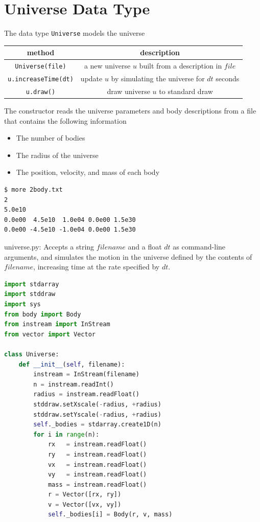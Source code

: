 \documentclass[8pt,a4paper,compress,handout]{beamer}
\begin{document}
\section{Universe Data Type}
\begin{frame}[fragile]
The data type \lstinline{Universe} models the universe
\begin{center}
\begin{tabular}{cc}
method & description \\ \hline
\lstinline$Universe(file)$ & a new universe $u$ built from a description in $file$ \\
\lstinline$u.increaseTime(dt)$ & update $u$ by simulating the universe for $dt$ seconds \\
\lstinline$u.draw()$ & draw universe $u$ to standard draw
\end{tabular} 
\end{center}

\bigskip

The constructor reads the universe parameters and body descriptions from a file that contains the following information
\begin{itemize}
\item The number of bodies
\item The radius of the universe
\item The position, velocity, and mass of each body
\end{itemize}
\begin{lstlisting}[language={}]
$ more 2body.txt
2 
5.0e10 
0.0e00  4.5e10  1.0e04 0.0e00 1.5e30 
0.0e00 -4.5e10 -1.0e04 0.0e00 1.5e30 
\end{lstlisting}
\end{frame}

\begin{frame}[fragile]
\begin{framed}
\tiny universe.py: Accepts a string $filename$ and a float $dt$ as command-line arguments, and simulates the motion in the universe defined by the contents of $filename$, increasing time at the rate specified by $dt$.
\end{framed}

\begin{lstlisting}[language=Python]
import stdarray
import stddraw
import sys
from body import Body 
from instream import InStream
from vector import Vector

class Universe:
    def __init__(self, filename):
        instream = InStream(filename)
        n = instream.readInt()
        radius = instream.readFloat()
        stddraw.setXscale(-radius, +radius)
        stddraw.setYscale(-radius, +radius)
        self._bodies = stdarray.create1D(n)
        for i in range(n):
            rx   = instream.readFloat()
            ry   = instream.readFloat()
            vx   = instream.readFloat()
            vy   = instream.readFloat()
            mass = instream.readFloat()
            r = Vector([rx, ry])
            v = Vector([vx, vy])
            self._bodies[i] = Body(r, v, mass)
\end{lstlisting}
\end{frame}
\end{document}
